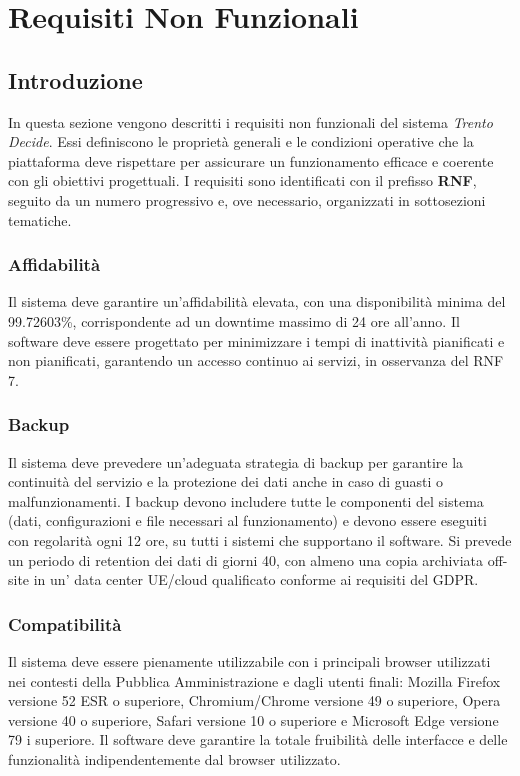 \setcounter{secnumdepth}{3}

\chapter{Requisiti Non Funzionali}

\renewcommand{\thesubsection}{RNF\arabic{subsection}}
\renewcommand{\thesubsubsection}{RNF\arabic{subsection}.\arabic{subsubsection}}

\setlength{\parskip}{0.4em}
\setlength{\parindent}{0pt}

\section{Introduzione}
In questa sezione vengono descritti i requisiti non funzionali del sistema \textit{Trento Decide}.
Essi definiscono le proprietà generali e le condizioni operative che la piattaforma deve rispettare per assicurare un funzionamento efficace e coerente con gli obiettivi progettuali.
I requisiti sono identificati con il prefisso \textbf{RNF}, seguito da un numero progressivo e, ove necessario, organizzati in sottosezioni tematiche.

\subsection{Affidabilità}
Il sistema deve garantire un'affidabilità elevata, con una disponibilità minima del 99.72603{\%}, corrispondente ad un downtime massimo di 24 ore all'anno. Il software deve essere progettato per minimizzare i tempi di inattività pianificati e non pianificati, garantendo un accesso continuo ai servizi, in osservanza del RNF 7.

\subsection{Backup}
Il sistema deve prevedere un’adeguata strategia di backup per garantire la continuità del servizio e la protezione dei dati anche in caso di guasti o malfunzionamenti.
I backup devono includere tutte le componenti del sistema (dati, configurazioni e file necessari al funzionamento) e devono essere eseguiti con regolarità ogni 12 ore, su tutti i sistemi che supportano il software. Si prevede un periodo di retention dei dati di giorni 40, con almeno una copia archiviata off-site in un' data center UE/cloud qualificato conforme ai requisiti del GDPR.

\subsection{Compatibilità}
Il sistema deve essere pienamente utilizzabile con i principali browser utilizzati nei contesti della Pubblica Amministrazione e dagli utenti finali: Mozilla Firefox versione 52 ESR o superiore, Chromium/Chrome versione 49 o superiore, Opera versione 40 o superiore, Safari versione 10 o superiore e Microsoft Edge versione 79 i superiore. Il software deve garantire la totale fruibilità delle interfacce e delle funzionalità indipendentemente dal browser utilizzato.

